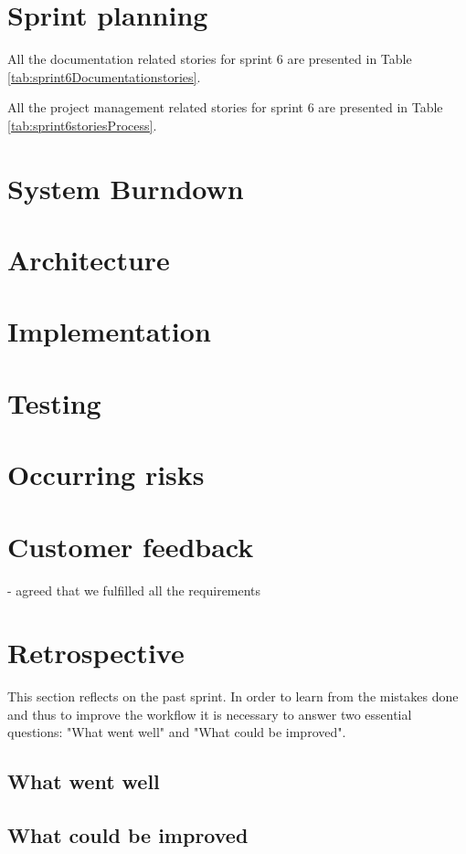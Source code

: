 \section{Sprint planning}

All the documentation related stories for sprint 6 are presented in Table \ref{tab:sprint6Documentationstories}.


All the project management related stories for sprint 6 are presented in Table \ref{tab:sprint6storiesProcess}.

\section{System Burndown}
\section{Architecture}
\section{Implementation}
\section{Testing}
\section{Occurring risks}
\section{Customer feedback}
- agreed that we fulfilled all the requirements

\section{Retrospective}
This section reflects on the past sprint. In order to learn from the mistakes done and thus to improve the workflow it is necessary to answer two essential questions: "What went well" and "What could be improved".

\subsection{What went well}
\subsection{What could be improved}
